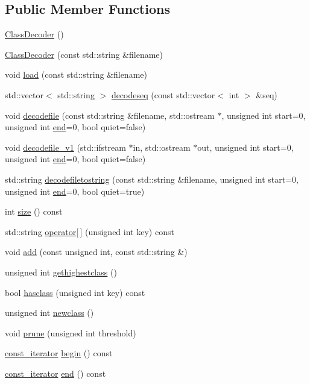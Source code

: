 \subsection*{Public Member Functions}
\begin{DoxyCompactItemize}
\item 
\hyperlink{classClassDecoder_a1964931b3b4f83220f0468e9a5a3f5ab}{Class\+Decoder} ()
\item 
\hyperlink{classClassDecoder_ae68c4f3ffc8bc69d67750828876484ce}{Class\+Decoder} (const std\+::string \&filename)
\item 
void \hyperlink{classClassDecoder_a497f71de32cb7cfafbb67657afc6a2be}{load} (const std\+::string \&filename)
\item 
std\+::vector$<$ std\+::string $>$ \hyperlink{classClassDecoder_ac7b469a8815a77b07daee3e76ef41f8f}{decodeseq} (const std\+::vector$<$ int $>$ \&seq)
\item 
void \hyperlink{classClassDecoder_a6e9e821e67a97d9197047d64a5e1cb18}{decodefile} (const std\+::string \&filename, std\+::ostream $\ast$, unsigned int start=0, unsigned int \hyperlink{classClassDecoder_af3c11f55c5acdc9e0e6f7ec4ec0a45e7}{end}=0, bool quiet=false)
\item 
void \hyperlink{classClassDecoder_a794e96f70f095be218f4606d17c0e529}{decodefile\+\_\+v1} (std\+::ifstream $\ast$in, std\+::ostream $\ast$out, unsigned int start=0, unsigned int \hyperlink{classClassDecoder_af3c11f55c5acdc9e0e6f7ec4ec0a45e7}{end}=0, bool quiet=false)
\item 
std\+::string \hyperlink{classClassDecoder_a75348f84c3f9eb4f699f1b0986593ea6}{decodefiletostring} (const std\+::string \&filename, unsigned int start=0, unsigned int \hyperlink{classClassDecoder_af3c11f55c5acdc9e0e6f7ec4ec0a45e7}{end}=0, bool quiet=true)
\item 
int \hyperlink{classClassDecoder_af4a58ebdaed62bbc27f3d0fd860c9dde}{size} () const 
\item 
std\+::string \hyperlink{classClassDecoder_ab212c7a5643348965fc70e85ccf6a454}{operator\mbox{[}$\,$\mbox{]}} (unsigned int key) const 
\item 
void \hyperlink{classClassDecoder_aa962f31cc3abbb4420a89419e02d141a}{add} (const unsigned int, const std\+::string \&)
\item 
unsigned int \hyperlink{classClassDecoder_a90399b17e31b20a7330fcdd501e8350a}{gethighestclass} ()
\item 
bool \hyperlink{classClassDecoder_ade08d075b70964c24a2fba6b5f43f7da}{hasclass} (unsigned int key) const 
\item 
unsigned int \hyperlink{classClassDecoder_ab8418982b22ee11e48d89175bcf5e66d}{newclass} ()
\item 
void \hyperlink{classClassDecoder_aaddeef1f5e8730eb6eeb5351db4eb826}{prune} (unsigned int threshold)
\item 
\hyperlink{classClassDecoder_a24770930683eb9829a898343fe016929}{const\+\_\+iterator} \hyperlink{classClassDecoder_ab52e0396600b9fca95348c603b6aca7d}{begin} () const 
\item 
\hyperlink{classClassDecoder_a24770930683eb9829a898343fe016929}{const\+\_\+iterator} \hyperlink{classClassDecoder_af3c11f55c5acdc9e0e6f7ec4ec0a45e7}{end} () const 
\end{DoxyCompactItemize}
